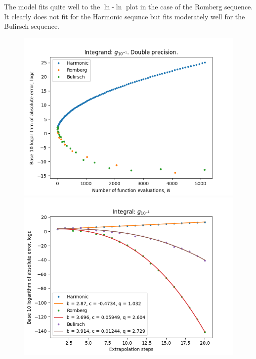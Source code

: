 The model fits quite well to the \(\ln\)-\(\ln\) plot in the case of the Romberg sequence. It clearly does not fit for the Harmonic sequnce but fits moderately well for the Bulirsch sequence.

\begin{figure}[H]
\centering
\begin{minipage}{0.45\textwidth}
\centering
\includegraphics[scale=0.45]{romberg_plots/g_tenth.png}
\end{minipage}
\begin{minipage}{0.45\textwidth}
\centering
\includegraphics[scale=0.45]{romberg_plots/g_tenth_hp_steps.png}
\end{minipage}
\end{figure}

